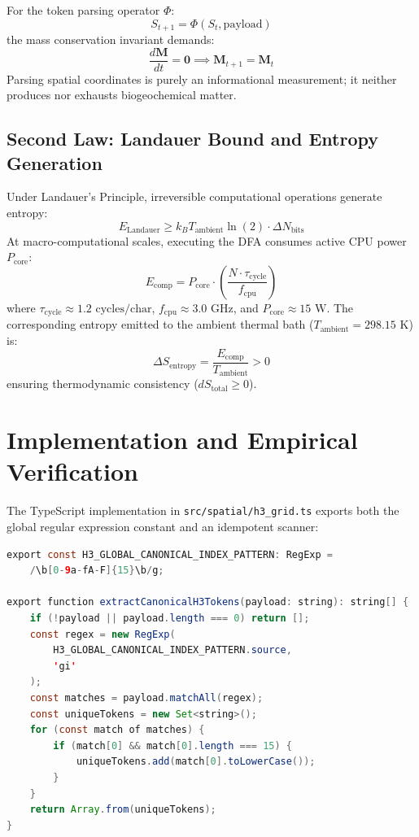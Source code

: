 \documentclass[10pt,journal,compsoc]{IEEEtran}
\begin{document}
For the token parsing operator $\Phi$:
\begin{equation}
S_{t+1} = \Phi(S_t, \text{payload})
\end{equation}
the mass conservation invariant demands:
\begin{equation}
\frac{d\mathbf{M}}{dt} = \mathbf{0} \implies \mathbf{M}_{t+1} = \mathbf{M}_t
\end{equation}
Parsing spatial coordinates is purely an informational measurement; it neither produces nor exhausts biogeochemical matter.

\subsection{Second Law: Landauer Bound and Entropy Generation}
Under Landauer's Principle, irreversible computational operations generate entropy:
\begin{equation}
E_{\text{Landauer}} \ge k_B T_{\text{ambient}} \ln(2) \cdot \Delta N_{\text{bits}}
\end{equation}
At macro-computational scales, executing the DFA consumes active CPU power $P_{\text{core}}$:
\begin{equation}
E_{\text{comp}} = P_{\text{core}} \cdot \left( \frac{N \cdot \tau_{\text{cycle}}}{f_{\text{cpu}}} \right)
\end{equation}
where $\tau_{\text{cycle}} \approx 1.2\text{ cycles/char}$, $f_{\text{cpu}} \approx 3.0\text{ GHz}$, and $P_{\text{core}} \approx 15\text{ W}$. The corresponding entropy emitted to the ambient thermal bath ($T_{\text{ambient}} = 298.15\text{ K}$) is:
\begin{equation}
\Delta S_{\text{entropy}} = \frac{E_{\text{comp}}}{T_{\text{ambient}}} > 0
\end{equation}
ensuring thermodynamic consistency ($dS_{\text{total}} \ge 0$).

\section{Implementation and Empirical Verification}

The TypeScript implementation in \texttt{src/spatial/h3\_grid.ts} exports both the global regular expression constant and an idempotent scanner:

\begin{lstlisting}[language=Java]
export const H3_GLOBAL_CANONICAL_INDEX_PATTERN: RegExp = 
    /\b[0-9a-fA-F]{15}\b/g;

export function extractCanonicalH3Tokens(payload: string): string[] {
    if (!payload || payload.length === 0) return [];
    const regex = new RegExp(
        H3_GLOBAL_CANONICAL_INDEX_PATTERN.source, 
        'gi'
    );
    const matches = payload.matchAll(regex);
    const uniqueTokens = new Set<string>();
    for (const match of matches) {
        if (match[0] && match[0].length === 15) {
            uniqueTokens.add(match[0].toLowerCase());
        }
    }
    return Array.from(uniqueTokens);
}
\end{lstlisting}
\end{document}
